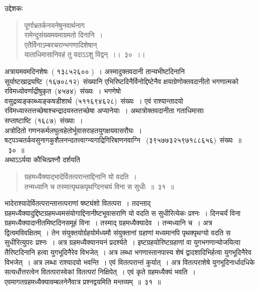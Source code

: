 \documentclass[11pt, openany]{book}
\begin{document}
\newpage
\thispagestyle{fancy}
\fancyhf{}
\indent
उद्देशकः\textendash
\begin{quote}
{\ku पूर्णाभ्रतर्कनयनेषुनवार्थनाग\textendash\\
रामेन्दुसंख्यमवमाग्रमतो दिनानि~।\\
एतैर्विनाऽम्बरचरान्भगणादिशेषान्\\
याताधिमासानिवहं तु वदाऽऽशु विद्वन्~।।~३०~।।}
\end{quote}
\indent
अत्रायमवमदिनशेषः~( १३८५२६०० )~। अस्मादुक्तवदानी तान्यभीष्टदिनानि सूर्याष्टखाद्र्यष्टि~(१६७०८१२)~संख्यानि एभिरिष्टदिनैर्विनोद्दिष्टेनैव क्षयाग्रेणोक्तवदानीतो भगणात्मको रविमध्योवर्णाद्रीषुकृत~(४५७४)~संख्यः~। भगणेषो वसुद्रव्यङ्काब्ध्यङ्कषडीशार्थ~(५११६९४६२८)~संख्यः~। एवं राश्यान्तादयो रविमध्यास्तत्तच्छेषाश्चन्द्रादयस्तत्तच्छेषा अप्यानेयाः~। अथात्रोक्तवदानीता गताधिमासाः सप्ताष्टाष्टि~(१६८७)~संख्याः~।\\
\indent
अत्रोदितो गणनकर्मलघुत्वहेतोर्भूवासराहतयुगक्षयवासरौघः~।
षट्पञ्चतर्कवसुनागकुशैलनन्दतत्त्वाग्न्यगाद्रिगिरिबाणनवाग्नि
~(३९५७७३२५९७१८८६५६)~संख्यः~॥~३०~॥\\
\indent
अथाऽऽर्यया कौचित्प्रश्नौ दर्शयति\textendash
\begin{quote}
{\ks ग्रहमध्यैक्याद्भादेर्वितत्परान्ताद्दिनानि यो वदति~।\\
तन्मध्यानि च तस्मात्पृथकपृथग्दिनचयं विना स सुधीः~॥~३१~॥}
\end{quote}
\indent
भादेराश्यादेर्वितत्परान्तात्तत्पराणां षष्ट्यंशो वितत्परा~। तदन्ताद्
ग्रहमध्यैक्यादुद्दिष्टग्रहमध्यमसंयोगाद्दिनानीष्टभूवासराणि यो वदति स सुधीरित्येकः प्रश्नः~। दिनचर्यं विना ग्रहमध्यैक्यादानीतमिष्टदिनसमूहं विना~। तस्माद् ग्रहमध्यैक्यादेव~। तन्मध्यानि च~। अत्र द्वित्वमविवक्षितम्~। तेन संयुक्तयोर्ग्रहयोर्मध्यमौ संयुक्तानां ग्रहाणां मध्यमानपि पृथक्पृथग्यो वदति स सुधीरित्युपरः प्रश्नः~। अत्र ग्रहमध्यैक्यानयनं प्रदर्श्यते~। इष्टग्रहयोरिष्टग्रहाणां वा युगभगणान्योजयित्वा तैरिष्टदिनानि हत्वा युगभूदिनैरेव विभजेत्~। अत्र लब्धा भगणास्तानपास्य शेषं द्वादशादिभिर्हत्वा युगभूदिनैरेव विभजेत्~। अत्र लब्धा राश्यादयो भवन्ति~। एवं वितत्परान्तं कुर्यात्~। अत्र वितत्पराशेषे युगभूदिनार्धादधिके सत्यर्धोत्तरत्वेन वितत्परास्वेकां वितत्परां निक्षिपेत्~। एवं कृते ग्रहमध्यैक्यं भवति~। एवमागतग्रहमध्यैक्यावम्बलनेनैवात्र प्रश्नद्वयमिति मन्तव्यम्~॥~३१~॥
\end{document}
